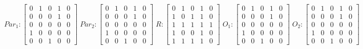      $$
        Par_{1} : \begin{bmatrix}
            0 & 1 & 0 & 1 & 0 \\
            0 & 0 & 0 & 1 & 0 \\
            0 & 0 & 0 & 0 & 0 \\
			1 & 0 & 0 & 0 & 0 \\
            0 & 0 & 1 & 0 & 0 
        \end{bmatrix}
        \;
        Par_{2} : \begin{bmatrix}
            0 & 1 & 0 & 1 & 0 \\
            0 & 0 & 0 & 1 & 0 \\
            0 & 0 & 0 & 0 & 0 \\
            1 & 0 & 0 & 0 & 0 \\
            0 & 0 & 1 & 0 & 0
        \end{bmatrix}
        \;
        R : \begin{bmatrix}
            0 & 1 & 0 & 1 & 0 \\
            1 & 0 & 1 & 1 & 0 \\
            1 & 1 & 1 & 1 & 1 \\
            1 & 0 & 0 & 1 & 0 \\
            1 & 1 & 1 & 1 & 0
        \end{bmatrix}
        \;
        O_{1} : \begin{bmatrix}
            0 & 1 & 0 & 1 & 0 \\
            0 & 0 & 0 & 1 & 0 \\
            0 & 0 & 0 & 0 & 0 \\
            1 & 0 & 0 & 0 & 0 \\
            0 & 0 & 1 & 0 & 0
        \end{bmatrix}
        \;
        O_{2} : \begin{bmatrix}
            0 & 1 & 0 & 1 & 0 \\
            0 & 0 & 0 & 1 & 0 \\
            0 & 0 & 0 & 0 & 0 \\
            1 & 0 & 0 & 0 & 0 \\
            0 & 0 & 1 & 0 & 0
        \end{bmatrix}
    $$ 
